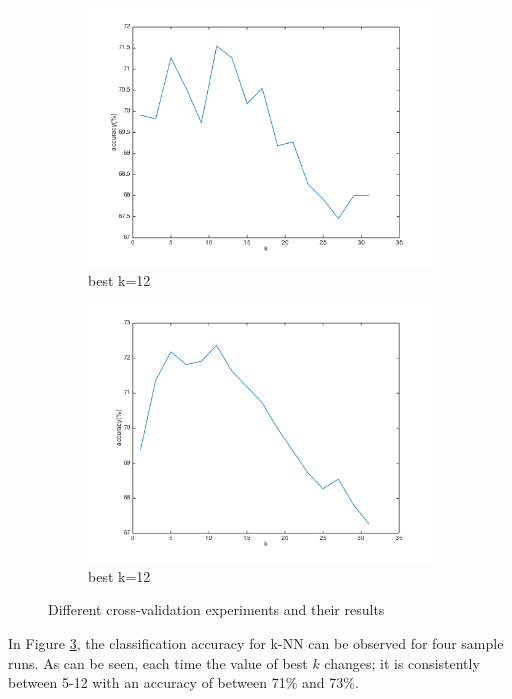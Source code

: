 \documentclass[]{article}
\begin{document}
\begin{figure}[h!]
	\begin{subfigure}{.49\textwidth}
		\centering
		\includegraphics[width=1\linewidth]{../images-update/1-(2)-3.png}
		\caption{best k=12}
		\label{fig:sub1}
	\end{subfigure}
	\begin{subfigure}{.49\textwidth}
		\centering
		\includegraphics[width=1\linewidth]{../images-update/1-(2)-4.png}
		\caption{best k=12}
		\label{fig:sub1}
	\end{subfigure}		
		\caption{Different cross-validation experiments and their results}
	\label{fig:knn}
\end{figure}

In Figure \ref{fig:knn}, the classification accuracy for k-NN can be observed for four sample runs.  As can be seen, each time the value of best $k$ changes; it is consistently between 5-12 with an accuracy of between 71\% and 73\%.
\end{document}

